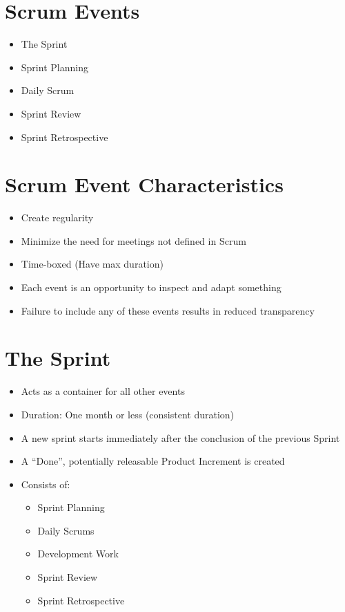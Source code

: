 \documentclass[a4paper,11pt,twocolumn]{article}
\begin{document}
\section*{Scrum Events}
\begin{itemize}
    \item The Sprint
	\item Sprint Planning
	\item Daily Scrum
	\item Sprint Review
	\item Sprint Retrospective
\end{itemize}

\section*{Scrum Event Characteristics}
\begin{itemize}
    \item Create regularity
	\item Minimize the need for meetings not defined in Scrum
	\item Time-boxed (Have max duration)
	\item Each event is an opportunity to inspect and adapt something
	\item Failure to include any of these events results in reduced transparency
\end{itemize}

\section*{The Sprint}
\begin{itemize}
    \item Acts as a container for all other events
	\item Duration: One month or less (consistent duration)
	\item A new sprint starts immediately after the conclusion of the previous Sprint
	\item A ``Done'', potentially releasable Product Increment is created
	\item Consists of:
	\vspace{-1em}
    \begin{itemize}
        \setlength\itemsep{0em}
        \item Sprint Planning
        \item Daily Scrums
        \item Development Work
        \item Sprint Review
        \item Sprint Retrospective
    \end{itemize}
\end{itemize}
\end{document}
